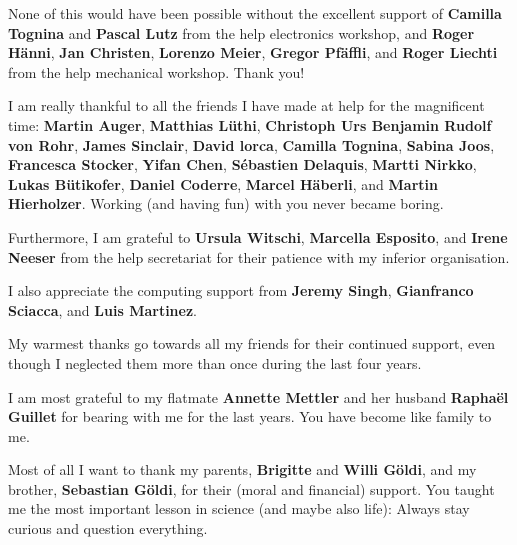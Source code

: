 None of this would have been possible without the excellent support of \textbf{Camilla Tognina} and \textbf{Pascal Lutz} from the \gls{help} electronics workshop, and \textbf{Roger Hänni}, \textbf{Jan Christen}, \textbf{Lorenzo Meier}, \textbf{Gregor Pfäffli}, and \textbf{Roger Liechti} from the \gls{help} mechanical workshop. Thank you!

I am really thankful to all the friends I have made at \gls{help} for the magnificent time: \textbf{Martin Auger}, \textbf{Matthias Lüthi}, \textbf{Christoph Urs Benjamin Rudolf von Rohr}, \textbf{James Sinclair}, \textbf{David \gls{lorca}}, \textbf{Camilla Tognina}, \textbf{Sabina Joos}, \textbf{Francesca Stocker}, \textbf{Yifan Chen}, \textbf{Sébastien Delaquis}, \textbf{Martti Nirkko}, \textbf{Lukas Bütikofer}, \textbf{Daniel Coderre}, \textbf{Marcel Häberli}, and \textbf{Martin Hierholzer}.
Working (and having fun) with you never became boring.

Furthermore, I am grateful to \textbf{Ursula Witschi}, \textbf{Marcella Esposito}, and \textbf{Irene Neeser} from the \gls{help} secretariat for their patience with my inferior organisation.

I also appreciate the computing support from \textbf{Jeremy Singh}, \textbf{Gianfranco Sciacca}, and \textbf{Luis Martinez}.

My warmest thanks go towards all my friends for their continued support, even though I neglected them more than once during the last four years.

I am most grateful to my flatmate \textbf{Annette Mettler} and her husband \textbf{Raphaël Guillet} for bearing with me for the last years.
You have become like family to me.

Most of all I want to thank my parents, \textbf{Brigitte} and \textbf{Willi Göldi}, and my brother, \textbf{Sebastian Göldi}, for their (moral and financial) support.
You taught me the most important lesson in science (and maybe also life): Always stay curious and question everything.